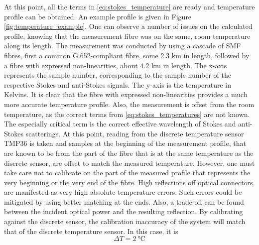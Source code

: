 \documentclass{standalone}
\begin{document}
At this point, all the terms in \ref{eq:stokes_temperature} are ready and temperature profile can be obtained. An example profile is given in Figure \ref{fig:temperature_example}.
One can observe a number of issues on the calculated profile, knowing that the measurement fibre was on the same, room temperature along its length. The measurement was conducted by using a cascade of SMF fibres, first a common G.652-compliant fibre, some 2.3 km in length, followed by a fibre with expressed non-linearities, about 4.2 km in length. The x-axis represents the sample number, corresponding to the sample number of the respective Stokes and anti-Stokes signals. The y-axis is the temperature in Kelvins. It is clear that the fibre with expressed non-linearities provides a much more accurate temperature profile. Also, the measurement is offset from the room temperature, as the correct terms from \ref{eq:stokes_temperatures} are not known. The especially critical term is the correct effective wavelength of Stokes and anti-Stokes scatterings. At this point, reading from the discrete temperature sensor TMP36 is taken and samples at the beginning of the measurement profile, that are known to be from the part of the fibre that is at the same temperature as the discrete sensor, are offset to match the measured temperature. However, one must take care not to calibrate on the part of the measured profile that represents the very beginning or the very end of the fibre. High reflections off optical connectors are manifested as very high absolute temperature errors. Such errors could be mitigated by using better matching at the ends. Also, a trade-off can be found between the incident optical power and the resulting reflection. By calibrating against the discrete sensor, the calibration inaccuracy of the system will match that of the discrete temperature sensor. In this case, it is
\begin{equation}
\varDelta T = \SI{2}{\celsius}
\end{equation}
\end{document}
